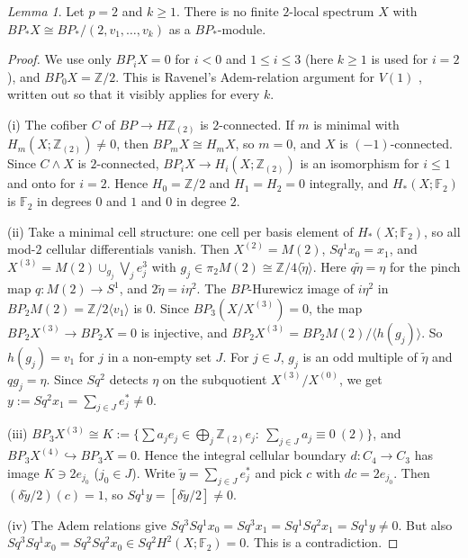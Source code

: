 \documentclass[11pt]{amsart}
\theoremstyle{remark}
\newtheorem{lemma}[theorem]{Lemma}
\begin{document}
\begin{lemma}\label{lem:p2}
Let $p=2$ and $k\ge1$. There is no finite $2$-local spectrum $X$ with $BP_*X\cong BP_*/(2,v_1,\dots,v_k)$
as a $BP_*$-module.
\end{lemma}
\begin{proof}
We use only $BP_iX=0$ for $i<0$ and $1\le i\le3$ (here $k\ge1$ is used for $i=2$), and $BP_0X=\mathbb Z/2$.
This is Ravenel's Adem-relation argument for $V(1)$ \cite[\S1.3, p.~19]{Rav}, written out so that it
visibly applies for every $k$.

(i) The cofiber $C$ of $BP\to H\mathbb Z_{(2)}$ is $2$-connected. If $m$ is minimal with $H_m(X;\mathbb Z_{(2)})\ne0$,
then $BP_mX\cong H_mX$, so $m=0$, and $X$ is $(-1)$-connected. Since $C\wedge X$ is $2$-connected,
$BP_iX\to H_i(X;\mathbb Z_{(2)})$ is an isomorphism for $i\le1$ and onto for $i=2$. Hence $H_0=\mathbb Z/2$ and
$H_1=H_2=0$ integrally, and $H_*(X;\mathbb F_2)$ is $\mathbb F_2$ in degrees $0$ and $1$ and $0$ in degree $2$.

(ii) Take a minimal cell structure: one cell per basis element of $H_*(X;\mathbb F_2)$, so all mod-$2$
cellular differentials vanish. Then $X^{(2)}=M(2)$, $Sq^1x_0=x_1$, and
$X^{(3)}=M(2)\cup_{g_j}\bigvee_j e^3_j$ with $g_j\in\pi_2M(2)\cong\mathbb Z/4\langle\tilde\eta\rangle$. Here
$q\tilde\eta=\eta$ for the pinch map $q\colon M(2)\to S^1$, and $2\tilde\eta=i\eta^2$. The $BP$-Hurewicz image of $i\eta^2$ in
$BP_2M(2)=\mathbb Z/2\langle v_1\rangle$ is $0$. Since $BP_3(X/X^{(3)})=0$, the map $BP_2X^{(3)}\to BP_2X=0$
is injective, and $BP_2X^{(3)}=BP_2M(2)/\langle h(g_j)\rangle$. So $h(g_{j})=v_1$ for $j$ in a non-empty set $J$.
For $j\in J$, $g_j$ is an odd multiple of $\tilde\eta$ and $qg_j=\eta$. Since $Sq^2$ detects $\eta$ on the subquotient
$X^{(3)}/X^{(0)}$, we get $y:=Sq^2x_1=\sum_{j\in J}e_j^*\neq0$.

(iii) $BP_3X^{(3)}\cong K:=\{\sum a_je_j\in\bigoplus_j\mathbb Z_{(2)}e_j:\ \sum_{j\in J}a_j\equiv0\ (2)\}$, and
$BP_3X^{(4)}\hookrightarrow BP_3X=0$. Hence the integral cellular boundary $d\colon C_4\to C_3$ has image $K\ni2e_{j_0}$
($j_0\in J$). Write $\tilde y=\sum_{j\in J}e_j^*$ and pick $c$ with $dc=2e_{j_0}$. Then $(\delta\tilde y/2)(c)=1$, so
$Sq^1y=[\delta\tilde y/2]\neq0$.

(iv) The Adem relations give $Sq^3Sq^1x_0=Sq^3x_1=Sq^1Sq^2x_1=Sq^1y\ne0$. But also
$Sq^3Sq^1x_0=Sq^2Sq^2x_0\in Sq^2H^2(X;\mathbb F_2)=0$. This is a contradiction.
\end{proof}
\end{document}
